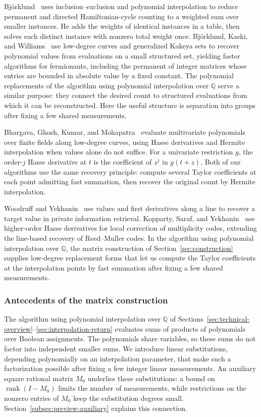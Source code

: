 \documentclass[11pt,reqno]{amsart}
\numberwithin{equation}{section}
\theoremstyle{definition}\newtheorem{definition}[theorem]{Definition}
\theoremstyle{remark}\newtheorem{remark}[theorem]{Remark}
\begin{document}
Bj\"orklund~\cite[Sections~2--3]{Bjo16} uses inclusion--exclusion and
polynomial interpolation to reduce permanent and directed
Hamiltonian-cycle counting to a weighted sum over smaller instances.
He adds the weights of identical instances in a table, then solves each
distinct instance with nonzero total weight once.
Bj\"orklund, Kaski, and Williams~\cite{BKW19} use
low-degree curves and generalized Kakeya sets to recover polynomial
values from evaluations on a small structured set, yielding faster
algorithms for fermionants, including the permanent of integer matrices whose entries are bounded in absolute value by a fixed constant.
The polynomial replacements of the algorithm using polynomial interpolation over $\mathbb Q$
serve a similar purpose: they connect
the desired count to structured evaluations from which it can be
reconstructed. Here the useful structure is separation into groups
after fixing a few shared measurements.

Bhargava, Ghosh, Kumar, and
Mohapatra~\cite[Sections~3.1--3.2]{BGKM23} evaluate multivariate
polynomials over finite fields along low-degree curves, using
Hasse derivatives and Hermite interpolation when values alone do not
suffice. For a univariate restriction $g$, the order-$j$
Hasse derivative at $t$ is the coefficient of $z^j$ in $g(t+z)$. Both of our algorithms use the same recovery principle: compute several Taylor
coefficients at each point admitting fast summation, then recover
the original count by Hermite interpolation.

Woodruff and Yekhanin~\cite{WY07} use values and first derivatives
along a line to recover a target value in private information retrieval.
Kopparty, Saraf, and Yekhanin~\cite{KSY14} use higher-order
Hasse derivatives for local correction of multiplicity codes, extending the
line-based recovery of Reed--Muller codes. In the algorithm using polynomial interpolation over $\mathbb Q$, the matrix construction of Section~\ref{sec:construction}
supplies low-degree replacement forms that let us
compute the Taylor coefficients at the interpolation points by fast
summation after fixing a few shared measurements.

\subsubsection{Antecedents of the matrix construction}\label{subsec:related-spectral}
The algorithm using polynomial interpolation over $\mathbb Q$ of
Sections~\ref{sec:technical-overview}--\ref{sec:interpolation-return}
evaluates sums of products of polynomials over
Boolean assignments. The polynomials share variables, so these sums
do not factor into independent smaller sums. We introduce linear
substitutions, depending polynomially on an interpolation parameter,
that make such a factorization possible after fixing a few integer
linear measurements. An auxiliary square rational matrix $M_0$
underlies these substitutions: a bound on $\operatorname{rank}(I-M_0)$
limits the number of measurements, while restrictions on the nonzero
entries of $M_0$ keep the substitution degrees small.
Section~\ref{subsec:preview-auxiliary} explains this connection.
\end{document}
